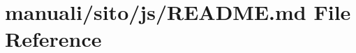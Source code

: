 \hypertarget{manuali_2sito_2js_2README_8md}{}\section{manuali/sito/js/\+R\+E\+A\+D\+ME.md File Reference}
\label{manuali_2sito_2js_2README_8md}
